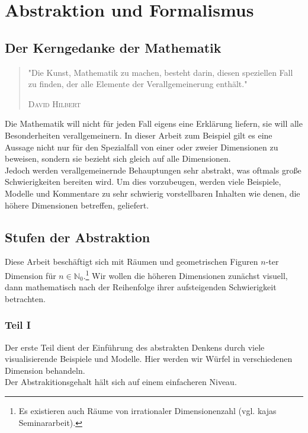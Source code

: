 \chapter{Abstraktion und Formalismus}
\label{sec:AuF}

\section{Der Kerngedanke der Mathematik}
\begin{quote}
"Die Kunst, Mathematik zu machen, besteht darin, diesen speziellen Fall zu finden, der alle Elemente der Verallgemeinerung enthält."
\begin{flushright}
\textsc{David Hilbert}
\end{flushright}
\end{quote}

Die Mathematik will nicht für jeden Fall eigens eine Erklärung liefern, sie will alle Besonderheiten verallgemeinern. In dieser Arbeit zum Beispiel gilt es eine Aussage nicht nur für den Spezialfall von einer oder zweier Dimensionen zu beweisen, sondern sie bezieht sich gleich auf alle Dimensionen. 
\\Jedoch werden verallgemeinernde Behauptungen sehr abstrakt, was oftmals große Schwierigkeiten bereiten wird. Um dies vorzubeugen, werden viele Beispiele, Modelle und Kommentare zu sehr schwierig vorstellbaren Inhalten wie denen, die höhere Dimensionen betreffen, geliefert.

\section{Stufen der Abstraktion}
Diese Arbeit beschäftigt sich mit Räumen und geometrischen Figuren $n$-ter Dimension für $n \in \mathbb{N}_{0}$.\footnote{Es existieren auch Räume von irrationaler Dimensionenzahl (vgl. kajas Seminararbeit).} Wir wollen die höheren Dimensionen zunächst visuell, dann mathematisch nach der Reihenfolge ihrer aufsteigenden Schwierigkeit betrachten. 
\subsection*{Teil I}
Der erste Teil dient der Einführung des abstrakten Denkens durch viele visualisierende Beispiele und Modelle. Hier werden wir Würfel in verschiedenen Dimension behandeln.
\\ Der Abstrakitionsgehalt hält sich auf einem einfacheren Niveau.
